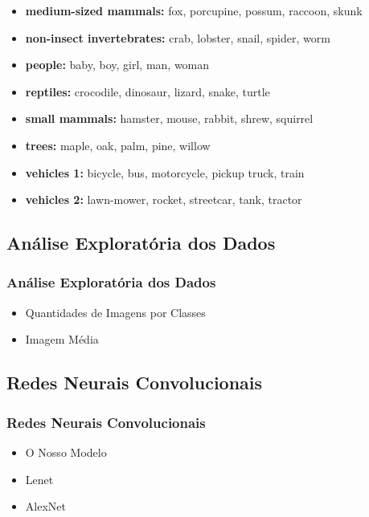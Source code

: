 \documentclass{beamer}
\begin{document}
\begin{frame}
\begin{itemize}
    \item \textbf{medium-sized mammals:} 	fox, porcupine, possum, raccoon, skunk
    \item \textbf{non-insect invertebrates:} 	crab, lobster, snail, spider, worm
    \item \textbf{people:} 	baby, boy, girl, man, woman
    \item \textbf{reptiles:} 	crocodile, dinosaur, lizard, snake, turtle
    \item \textbf{small mammals:} 	hamster, mouse, rabbit, shrew, squirrel
    \item \textbf{trees:} 	maple, oak, palm, pine, willow
    \item \textbf{vehicles 1:} 	bicycle, bus, motorcycle, pickup truck, train
    \item \textbf{vehicles 2:}	lawn-mower, rocket, streetcar, tank, tractor

\end{itemize}  
\end{frame}

\begin{frame}
\section{Análise Exploratória dos Dados}
\frametitle{Análise Exploratória dos Dados}
\begin{itemize}
\item Quantidades de Imagens por Classes
\item Imagem Média

\end{itemize}

\end{frame}
    






\begin{frame}
    \section{Redes Neurais Convolucionais}
    \frametitle{Redes Neurais Convolucionais}
        \begin{itemize}
            \item O Nosso Modelo
            \item Lenet
            \item AlexNet
        \end{itemize}
    
\end{frame}
\end{document}

